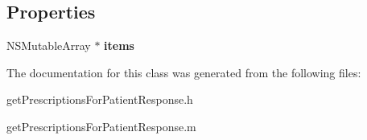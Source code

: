 \subsection*{Properties}
\begin{DoxyCompactItemize}
\item 
\hypertarget{interfaceget_prescriptions_for_patient_response_a051dac7f5a9c1f49a548f1e03580b0a9}{}N\+S\+Mutable\+Array $\ast$ {\bfseries items}\label{interfaceget_prescriptions_for_patient_response_a051dac7f5a9c1f49a548f1e03580b0a9}

\end{DoxyCompactItemize}


The documentation for this class was generated from the following files\+:\begin{DoxyCompactItemize}
\item 
get\+Prescriptions\+For\+Patient\+Response.\+h\item 
get\+Prescriptions\+For\+Patient\+Response.\+m\end{DoxyCompactItemize}
